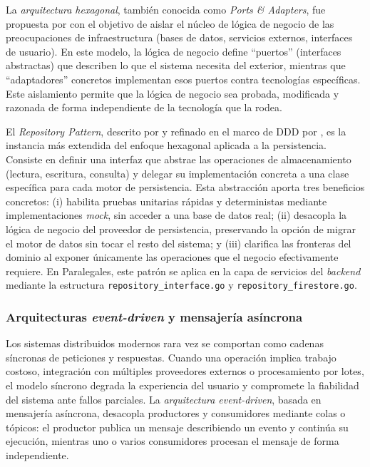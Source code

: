 La \textit{arquitectura hexagonal}, también conocida como \textit{Ports \& Adapters}, fue propuesta por \textcite{Cockburn2005} con el objetivo de aislar el núcleo de lógica de negocio de las preocupaciones de infraestructura (bases de datos, servicios externos, interfaces de usuario). En este modelo, la lógica de negocio define ``puertos'' (interfaces abstractas) que describen lo que el sistema necesita del exterior, mientras que ``adaptadores'' concretos implementan esos puertos contra tecnologías específicas. Este aislamiento permite que la lógica de negocio sea probada, modificada y razonada de forma independiente de la tecnología que la rodea.

El \textit{Repository Pattern}, descrito por \textcite{Fowler2002} y refinado en el marco de DDD por \textcite{Evans2003}, es la instancia más extendida del enfoque hexagonal aplicada a la persistencia. Consiste en definir una interfaz que abstrae las operaciones de almacenamiento (lectura, escritura, consulta) y delegar su implementación concreta a una clase específica para cada motor de persistencia. Esta abstracción aporta tres beneficios concretos: (i) habilita pruebas unitarias rápidas y deterministas mediante implementaciones \textit{mock}, sin acceder a una base de datos real; (ii) desacopla la lógica de negocio del proveedor de persistencia, preservando la opción de migrar el motor de datos sin tocar el resto del sistema; y (iii) clarifica las fronteras del dominio al exponer únicamente las operaciones que el negocio efectivamente requiere. En Paralegales, este patrón se aplica en la capa de servicios del \textit{backend} mediante la estructura \texttt{repository\_interface.go} y \texttt{repository\_firestore.go}.

\subsubsection{Arquitecturas \textit{event-driven} y mensajería asíncrona}

Los sistemas distribuidos modernos rara vez se comportan como cadenas síncronas de peticiones y respuestas. Cuando una operación implica trabajo costoso, integración con múltiples proveedores externos o procesamiento por lotes, el modelo síncrono degrada la experiencia del usuario y compromete la fiabilidad del sistema ante fallos parciales. La \textit{arquitectura event-driven}, basada en mensajería asíncrona, desacopla productores y consumidores mediante colas o tópicos: el productor publica un mensaje describiendo un evento y continúa su ejecución, mientras uno o varios consumidores procesan el mensaje de forma independiente.

